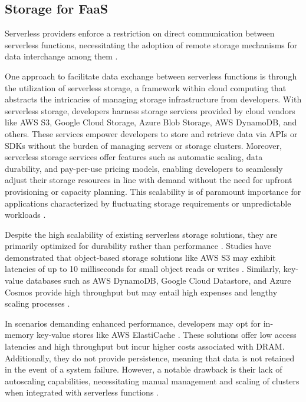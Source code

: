 \subsection{Storage for FaaS}

Serverless providers enforce a restriction on direct communication between serverless functions, necessitating the adoption of remote storage mechanisms for data interchange among them \cite{jonas2019cloud,klimovic2018pocket,romero2021faat}.

One approach to facilitate data exchange between serverless functions is through the utilization of serverless storage, a framework within cloud computing that abstracts the intricacies of managing storage infrastructure from developers. With serverless storage, developers harness storage services provided by cloud vendors like AWS S3, Google Cloud Storage, Azure Blob Storage, AWS DynamoDB, and others. These services empower developers to store and retrieve data via APIs or SDKs without the burden of managing servers or storage clusters. Moreover, serverless storage services offer features such as automatic scaling, data durability, and pay-per-use pricing models, enabling developers to seamlessly adjust their storage resources in line with demand without the need for upfront provisioning or capacity planning. This scalability is of paramount importance for applications characterized by fluctuating storage requirements or unpredictable workloads  \cite{CloudObj90:online,AmazonDy45:online,DeCandia2007,AzureBlo83:online,CloudSto52:online,Datastor50:online,AzureCos63:online}.

Despite the high scalability of existing serverless storage solutions, they are primarily optimized for durability rather than performance \cite{jonas2019cloud,klimovic2018pocket,10.14778/3587136.3587139}. Studies have demonstrated that object-based storage solutions like AWS S3 may exhibit latencies of up to 10 milliseconds for small object reads or writes \cite{PublicCl96:online}. Similarly, key-value databases such as AWS DynamoDB, Google Cloud Datastore, and Azure Cosmos provide high throughput but may entail high expenses and lengthy scaling processes \cite{jonas2019cloud}.

In scenarios demanding enhanced performance, developers may opt for in-memory key-value stores like AWS ElastiCache \cite{AmazonEl88:online}. These solutions offer low access latencies and high throughput but incur higher costs associated with DRAM. Additionally, they do not provide persistence, meaning that data is not retained in the event of a system failure. However, a notable drawback is their lack of autoscaling capabilities, necessitating manual management and scaling of clusters when integrated with serverless functions \cite{jonas2019cloud,klimovic2018pocket,10.14778/3587136.3587139}.

